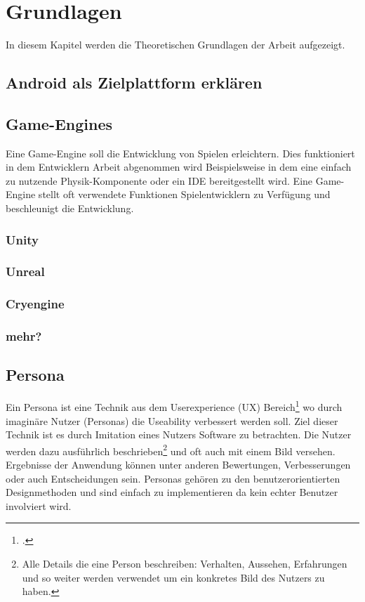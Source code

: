 \section{Grundlagen}
	In diesem Kapitel werden die Theoretischen Grundlagen der Arbeit aufgezeigt.
\subsection{Android als Zielplattform erklären}
\subsection{Game-Engines}
	Eine Game-Engine soll die Entwicklung von Spielen erleichtern. Dies funktioniert in dem Entwicklern Arbeit abgenommen wird Beispielsweise in dem eine einfach zu nutzende Physik-Komponente oder ein \gls{IDE} bereitgestellt wird. Eine Game-Engine stellt oft verwendete Funktionen Spielentwicklern zu Verfügung und beschleunigt die Entwicklung.
	\subsubsection*{Unity}
	\subsubsection*{Unreal}
	\subsubsection*{Cryengine}
	\subsubsection*{mehr?}
\subsection{Persona}\label{ssec:persona}
	Ein Persona ist eine Technik aus dem Userexperience (UX) Bereich\footcite{persona} wo durch imaginäre Nutzer (Personas) die Useability verbessert werden soll. Ziel dieser Technik ist es durch Imitation eines Nutzers Software zu betrachten. Die Nutzer werden dazu ausführlich beschrieben\footnote{Alle Details die eine Person beschreiben: Verhalten, Aussehen, Erfahrungen und so weiter werden verwendet um ein konkretes Bild des Nutzers zu haben.} und oft auch mit einem Bild versehen. Ergebnisse der Anwendung können unter anderen Bewertungen, Verbesserungen oder auch Entscheidungen sein.
	Personas gehören zu den benutzerorientierten Designmethoden und sind einfach zu implementieren da kein echter Benutzer involviert wird.

